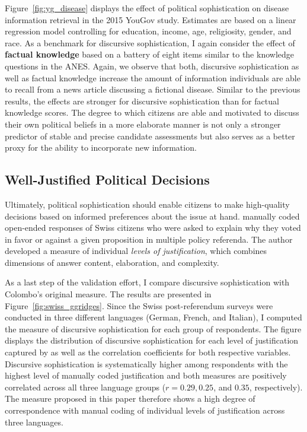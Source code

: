 \documentclass[12pt]{article}
\begin{document}
Figure~\ref{fig:yg_disease} displays the effect of political sophistication on disease information retrieval in the 2015 YouGov study. Estimates are based on a linear regression model controlling for education, income, age, religiosity, gender, and race. As a benchmark for discursive sophistication, I again consider the effect of \textbf{factual knowledge} based on a battery of eight items similar to the knowledge questions in the ANES. Again, we observe that both, discursive sophistication as well as factual knowledge increase the amount of information individuals are able to recall from a news article discussing a fictional disease. Similar to the previous results, the effects are stronger for discursive sophistication than for factual knowledge scores. The degree to which citizens are able and motivated to discuss their own political beliefs in a more elaborate manner is not only a stronger predictor of stable and precise candidate assessments but also serves as a better proxy for the ability to incorporate new information.


\subsection*{Well-Justified Political Decisions}

Ultimately, political sophistication should enable citizens to make high-quality decisions based on informed preferences about the issue at hand. \citet{colombo2016justifications} manually coded open-ended responses of Swiss citizens who were asked to explain why they voted in favor or against a given proposition in multiple policy referenda. The author developed a measure of individual \textit{levels of justification}, which combines dimensions of answer content, elaboration, and complexity.

As a last step of the validation effort, I compare discursive sophistication with Colombo's \citeyearpar{colombo2016justifications} original measure. The results are presented in Figure~\ref{fig:swiss_ggridges}. Since the Swiss post-referendum surveys were conducted in three different languages (German, French, and Italian), I computed the measure of discursive sophistication for each group of respondents. The figure displays the distribution of discursive sophistication for each level of justification captured by \citet{colombo2016justifications} as well as the correlation coefficients for both respective variables. Discursive sophistication is systematically higher among respondents with the highest level of manually coded justification and both measures are positively correlated across all three language groups ($r=0.29, 0.25$, and $0.35$, respectively). The measure proposed in this paper therefore shows a high degree of correspondence with manual coding of individual levels of justification across three languages.
\end{document}
